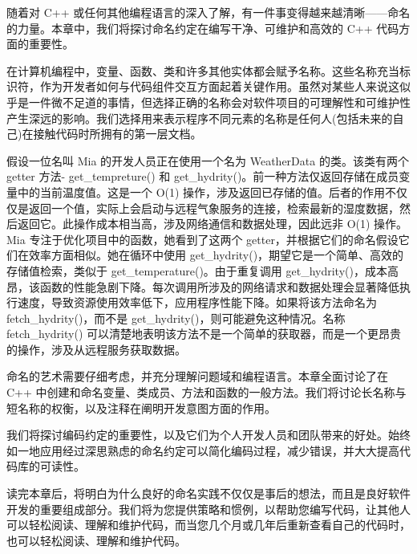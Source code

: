 随着对 C++ 或任何其他编程语言的深入了解，有一件事变得越来越清晰——命名的力量。本章中，我们将探讨命名约定在编写干净、可维护和高效的 C++ 代码方面的重要性。

在计算机编程中，变量、函数、类和许多其他实体都会赋予名称。这些名称充当标识符，作为开发者如何与代码组件交互方面起着关键作用。虽然对某些人来说这似乎是一件微不足道的事情，但选择正确的名称会对软件项目的可理解性和可维护性产生深远的影响。我们选择用来表示程序不同元素的名称是任何人(包括未来的自己)在接触代码时所拥有的第一层文档。

假设一位名叫 Mia 的开发人员正在使用一个名为 WeatherData 的类。该类有两个 getter 方法- get\_tempreture() 和 get\_hydrity()。前一种方法仅返回存储在成员变量中的当前温度值。这是一个 O(1) 操作，涉及返回已存储的值。后者的作用不仅仅是返回一个值，实际上会启动与远程气象服务的连接，检索最新的湿度数据，然后返回它。此操作成本相当高，涉及网络通信和数据处理，因此远非 O(1) 操作。 Mia 专注于优化项目中的函数，她看到了这两个 getter，并根据它们的命名假设它们在效率方面相似。她在循环中使用 get\_hydrity()，期望它是一个简单、高效的存储值检索，类似于 get\_temperature()。由于重复调用 get\_hydrity()，成本高昂，该函数的性能急剧下降。每次调用所涉及的网络请求和数据处理会显著降低执行速度，导致资源使用效率低下，应用程序性能下降。如果将该方法命名为 fetch\_hydrity()，而不是 get\_hydrity()，则可能避免这种情况。名称 fetch\_hydrity() 可以清楚地表明该方法不是一个简单的获取器，而是一个更昂贵的操作，涉及从远程服务获取数据。

命名的艺术需要仔细考虑，并充分理解问题域和编程语言。本章全面讨论了在 C++ 中创建和命名变量、类成员、方法和函数的一般方法。我们将讨论长名称与短名称的权衡，以及注释在阐明开发意图方面的作用。

我们将探讨编码约定的重要性，以及它们为个人开发人员和团队带来的好处。始终如一地应用经过深思熟虑的命名约定可以简化编码过程，减少错误，并大大提高代码库的可读性。

读完本章后，将明白为什么良好的命名实践不仅仅是事后的想法，而且是良好软件开发的重要组成部分。我们将为您提供策略和惯例，以帮助您编写代码，让其他人可以轻松阅读、理解和维护代码，而当您几个月或几年后重新查看自己的代码时，也可以轻松阅读、理解和维护代码。
